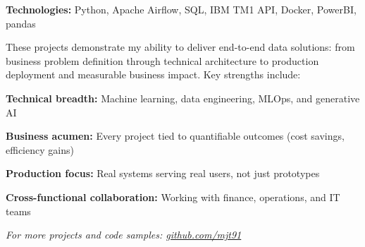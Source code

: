 \documentclass[11pt, a4paper]{awesome-cv}
\begin{document}
\begin{cvparagraph}
\textbf{Technologies:} Python, Apache Airflow, SQL, IBM TM1 API, Docker, PowerBI, pandas
\end{cvparagraph}

\vspace{1em}


\begin{cvparagraph}
These projects demonstrate my ability to deliver end-to-end data solutions: from business problem definition through technical architecture to production deployment and measurable business impact. Key strengths include:
\end{cvparagraph}

\begin{cvitems}
\item {\textbf{Technical breadth:} Machine learning, data engineering, MLOps, and generative AI}
\item {\textbf{Business acumen:} Every project tied to quantifiable outcomes (cost savings, efficiency gains)}
\item {\textbf{Production focus:} Real systems serving real users, not just prototypes}
\item {\textbf{Cross-functional collaboration:} Working with finance, operations, and IT teams}
\end{cvitems}

\vspace{1em}

\begin{center}
\textit{For more projects and code samples: \href{https://github.com/mjt91}{github.com/mjt91}}
\end{center}
\end{document}
